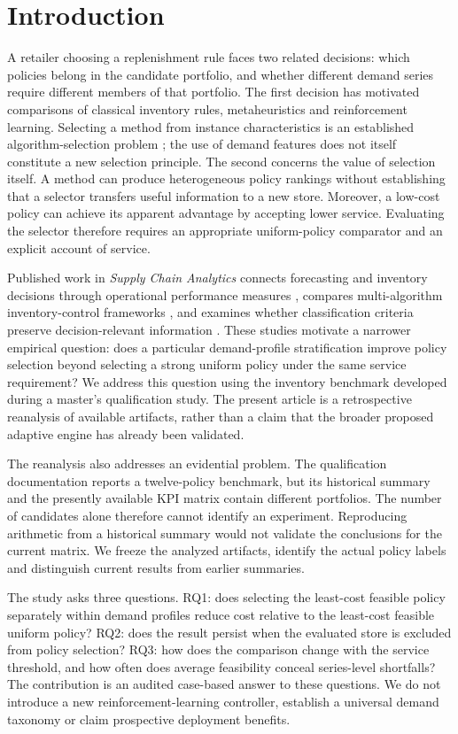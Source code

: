 \documentclass[preprint,12pt]{elsarticle}
\begin{document}
\section{Introduction}
A retailer choosing a replenishment rule faces two related decisions: which policies belong in the candidate portfolio, and whether different demand series require different members of that portfolio. The first decision has motivated comparisons of classical inventory rules, metaheuristics and reinforcement learning. Selecting a method from instance characteristics is an established algorithm-selection problem \cite{rice1976}; the use of demand features does not itself constitute a new selection principle. The second concerns the value of selection itself. A method can produce heterogeneous policy rankings without establishing that a selector transfers useful information to a new store. Moreover, a low-cost policy can achieve its apparent advantage by accepting lower service. Evaluating the selector therefore requires an appropriate uniform-policy comparator and an explicit account of service.

Published work in \emph{Supply Chain Analytics} connects forecasting and inventory decisions through operational performance measures \cite{sca_f81ad2b3e023}, compares multi-algorithm inventory-control frameworks \cite{sca_27e994c54848}, and examines whether classification criteria preserve decision-relevant information \cite{sca_c5c06dcbc9e5}. These studies motivate a narrower empirical question: does a particular demand-profile stratification improve policy selection beyond selecting a strong uniform policy under the same service requirement? We address this question using the inventory benchmark developed during a master's qualification study. The present article is a retrospective reanalysis of available artifacts, rather than a claim that the broader proposed adaptive engine has already been validated.

The reanalysis also addresses an evidential problem. The qualification documentation reports a twelve-policy benchmark, but its historical summary and the presently available KPI matrix contain different portfolios. The number of candidates alone therefore cannot identify an experiment. Reproducing arithmetic from a historical summary would not validate the conclusions for the current matrix. We freeze the analyzed artifacts, identify the actual policy labels and distinguish current results from earlier summaries.

The study asks three questions. RQ1: does selecting the least-cost feasible policy separately within demand profiles reduce cost relative to the least-cost feasible uniform policy? RQ2: does the result persist when the evaluated store is excluded from policy selection? RQ3: how does the comparison change with the service threshold, and how often does average feasibility conceal series-level shortfalls? The contribution is an audited case-based answer to these questions. We do not introduce a new reinforcement-learning controller, establish a universal demand taxonomy or claim prospective deployment benefits.
\end{document}
